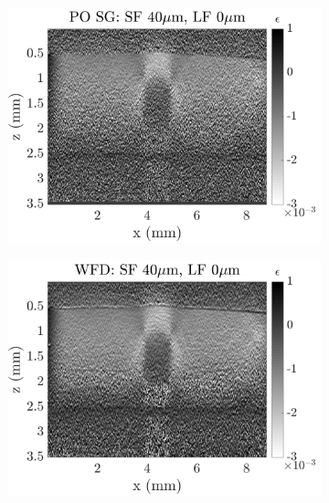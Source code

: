\begin{figure}[h]
\begin{subfigure}{0.49\textwidth}
        \includegraphics[width=\textwidth]{appendix_figs/posg_fr40_lr0.png}
    \end{subfigure}
    \begin{subfigure}{0.49\textwidth}
    	\centering
        \includegraphics[width=\textwidth]{appendix_figs/wfd_fr40_lr0.png}
    \end{subfigure}
    \\
    \begin{subfigure}{0.49\textwidth}
    	\centering

\end{subfigure}
\end{figure}
